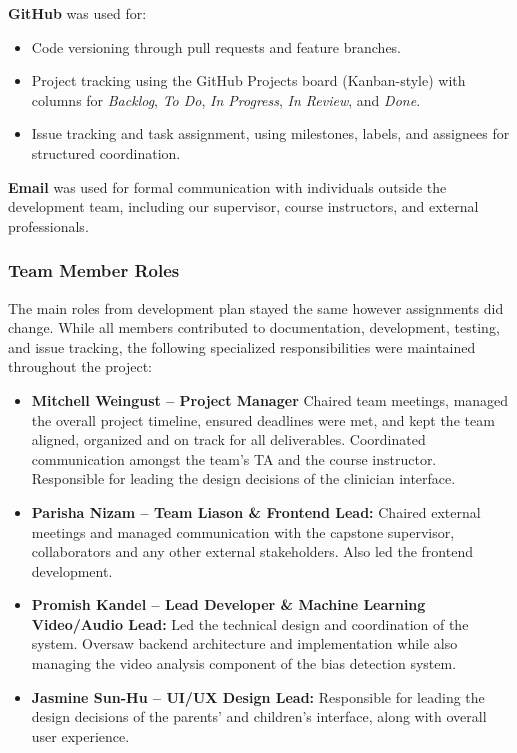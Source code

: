 \documentclass{article}
\begin{document}
\textbf{GitHub} was used for:
\begin{itemize}
    \item Code versioning through pull requests and feature branches.
    \item Project tracking using the GitHub Projects board (Kanban-style) with columns for \textit{Backlog}, \textit{To Do}, \textit{In Progress}, \textit{In Review}, and \textit{Done}.
    \item Issue tracking and task assignment, using milestones, labels, and assignees for structured coordination.
\end{itemize}

\textbf{Email} was used for formal communication with individuals outside the development team, including our supervisor, course instructors, and external professionals.

\subsubsection{Team Member Roles}

The main roles from development plan stayed the same however assignments did change.
While all members contributed to documentation, development, testing, and issue tracking, the following specialized responsibilities were maintained throughout the project:

\begin{itemize}
    \item \textbf{Mitchell Weingust – Project Manager }  
    Chaired team meetings, managed the overall project timeline, ensured deadlines were met, and kept the team aligned, organized and on track for all deliverables. Coordinated communication amongst the team's TA and the course instructor.
    Responsible for leading the design decisions of the clinician interface.

    \item \textbf{Parisha Nizam – Team Liason \& Frontend Lead:}  
    Chaired external meetings and managed communication with the capstone supervisor, collaborators and any other external stakeholders. Also led the frontend development. 

    \item \textbf{Promish Kandel – Lead Developer \& Machine Learning Video/Audio Lead:}  
    Led the technical design and coordination of the system. Oversaw backend architecture and implementation while also managing the video analysis component of the bias detection system.

    \item \textbf{Jasmine Sun-Hu – UI/UX Design Lead:}  
    Responsible for leading the design decisions of the parents' and children's interface, along with overall user experience.
\end{itemize}
\end{document}
